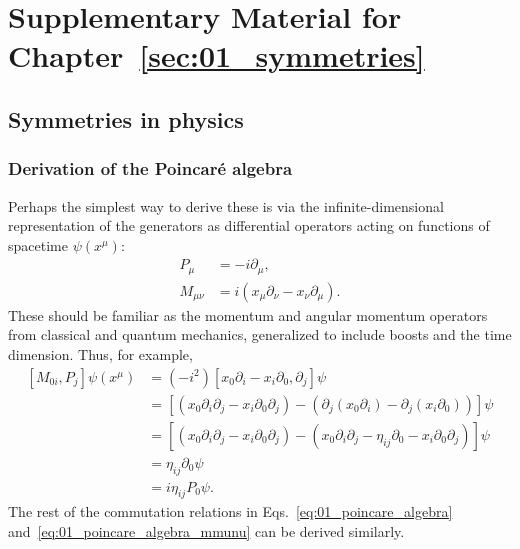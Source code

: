 \chapter{Supplementary Material for Chapter~\ref{sec:01_symmetries}}
\label{app:01}

\section{Symmetries in physics}
\label{app:01_ymmetries}

\subsection{Derivation of the Poincaré algebra}
\label{app:01_poincare_algebra}

Perhaps the simplest way to derive these is via the infinite-dimensional representation of the generators as differential operators acting on functions of spacetime $\psi(x^\mu)$:
\begin{equation}
	\label{eq:01_poincare_generators_diff_representation}
	\begin{split}
		P_\mu &= -i\partial_\mu, \\
		M_{\mu\nu} &= i(x_\mu \partial_\nu - x_\nu \partial_\mu).
	\end{split}
\end{equation}
These should be familiar as the momentum and angular momentum operators from classical and quantum mechanics, generalized to include boosts and the time dimension.
Thus, for example,
\begin{equation}
	\label{eq:01_poincare_commutation_derivation_example}
	\begin{split}
	[M_{0i}, P_j]\psi(x^\mu)
		&= (-i^2)[x_0\partial_i - x_i\partial_0, \partial_j]\psi \\
		&= [(x_0\partial_i\partial_j - x_i\partial_0\partial_j) - (\partial_j(x_0\partial_i) - \partial_j(x_i\partial_0))]\psi \\
		&= [(x_0\partial_i\partial_j - x_i\partial_0\partial_j) - (x_0\partial_i\partial_j - \eta_{ij}\partial_0 -  x_i\partial_0\partial_j)]\psi \\
		&= \eta_{ij}\partial_0 \psi \\
		&= i\eta_{ij}P_0\psi.
	\end{split}
\end{equation}
The rest of the commutation relations in Eqs.~\ref{eq:01_poincare_algebra} and~\ref{eq:01_poincare_algebra_mmunu} can be derived similarly.


